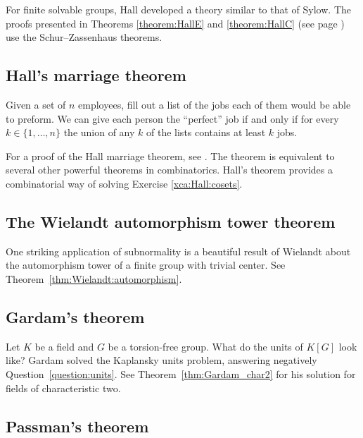 For finite solvable groups, Hall developed a theory similar to that of Sylow. The proofs
presented in Theorems \ref{theorem:HallE} and \ref{theorem:HallC} (see page \pageref{theorem:HallC}) use
the Schur--Zassenhaus theorems. 


\subsection*{Hall's marriage theorem}

Given a set of $n$ employees, fill out a list of the jobs each of them
would be able to preform. We can give each person the ``perfect'' job
if and only if for every $k\in\{1,\dots,n\}$ 
the union of any $k$ of the lists contains at least $k$ jobs. 

For a proof of the Hall marriage theorem, see \cite{MR33330}. 
The theorem is equivalent to several other
powerful theorems in combinatorics. Hall's theorem 
provides a combinatorial way of solving 
Exercise \ref{xca:Hall:cosets}. 


\subsection*{The Wielandt automorphism tower theorem}

One striking application of subnormality is a beautiful result 
of Wielandt about the automorphism tower of a finite group 
with trivial center. See 
Theorem~\ref{thm:Wielandt:automorphism}.

\subsection*{Gardam's theorem}

Let $K$ be a field and $G$ be a torsion-free group.
What do the units of $K[G]$ look like? 
Gardam solved the Kaplansky units problem, answering 
negatively Question~\ref{question:units}. 
See Theorem~\ref{thm:Gardam_char2} for his solution
for fields of characteristic two.  

\subsection*{Passman's theorem}


